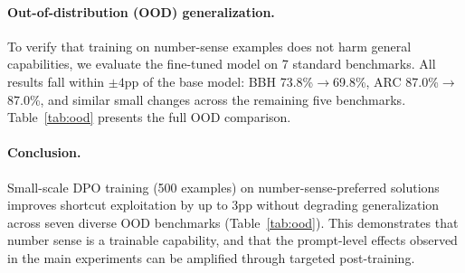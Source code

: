 \paragraph{Out-of-distribution (OOD) generalization.}
To verify that training on number-sense examples does not harm general capabilities, we evaluate the fine-tuned model on 7 standard benchmarks.
All results fall within $\pm 4$pp of the base model: BBH 73.8\%$\to$69.8\%, ARC 87.0\%$\to$87.0\%, and similar small changes across the remaining five benchmarks.
Table~\ref{tab:ood} presents the full OOD comparison.





\paragraph{Conclusion.}
Small-scale DPO training (500 examples) on number-sense-preferred solutions improves shortcut exploitation by up to 3pp without degrading generalization across seven diverse OOD benchmarks (Table~\ref{tab:ood}).
This demonstrates that number sense is a trainable capability, and that the prompt-level effects observed in the main experiments can be amplified through targeted post-training.
